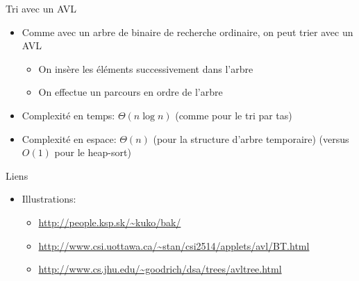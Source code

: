 \begin{frame}{Tri avec un AVL}

\begin{itemize}
\item Comme avec un arbre de binaire de recherche ordinaire, on peut trier avec un AVL
\begin{itemize}
\item On insère les éléments successivement dans l'arbre
\item On effectue un parcours en ordre de l'arbre
\end{itemize}
\item Complexité en temps: $\Theta(n\log n)$ (comme pour le tri par tas)
\item Complexité en espace: $\Theta(n)$ (pour la structure d'arbre temporaire) (versus $O(1)$ pour le heap-sort)
\end{itemize}

\end{frame}



\begin{frame}{Liens}
\begin{itemize}
\item Illustrations:
\begin{small}
\begin{itemize}
\item \url{http://people.ksp.sk/~kuko/bak/}
\item \url{http://www.csi.uottawa.ca/~stan/csi2514/applets/avl/BT.html}
\item \url{http://www.cs.jhu.edu/~goodrich/dsa/trees/avltree.html}
\end{itemize}
\end{small}
\end{itemize}
\end{frame}

